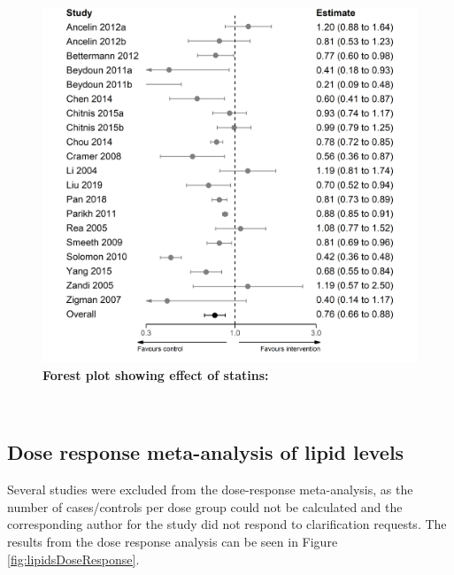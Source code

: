 \documentclass[a4paper, twoside]{templates/ociamthesis}
\begin{document}
\begin{figure}[H]
\includegraphics[width=1\linewidth]{figures/sys-rev/forester_statins_any} \caption[Forest plot showing effect of statins]{\textbf{Forest plot showing effect of statins:}}\label{fig:lipidsNRSE}
\end{figure}

~

\hypertarget{dose-response-results}{%
\subsection{Dose response meta-analysis of lipid levels}\label{dose-response-results}}

Several studies were excluded from the dose-response meta-analysis, as the number of cases/controls per dose group could not be calculated and the corresponding author for the study did not respond to clarification requests. The results from the dose response analysis can be seen in Figure \ref{fig:lipidsDoseResponse}.
\end{document}
